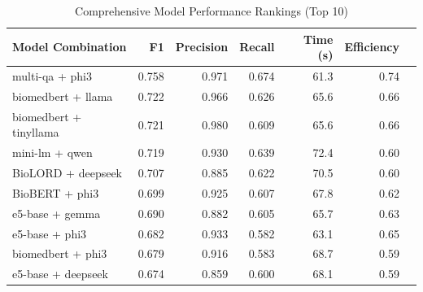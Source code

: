 \begin{table}
\caption{Comprehensive Model Performance Rankings (Top 10)}
\label{tab:comprehensive_rankings}
\begin{tabular}{lrrrrrr}
\toprule
Model Combination & F1 & Precision & Recall & Time (s) & Efficiency \\
\midrule
multi-qa + phi3 & 0.758 & 0.971 & 0.674 & 61.3 & 0.74 \\
biomedbert + llama & 0.722 & 0.966 & 0.626 & 65.6 & 0.66 \\
biomedbert + tinyllama & 0.721 & 0.980 & 0.609 & 65.6 & 0.66 \\
mini-lm + qwen & 0.719 & 0.930 & 0.639 & 72.4 & 0.60 \\
BioLORD + deepseek & 0.707 & 0.885 & 0.622 & 70.5 & 0.60 \\
BioBERT + phi3 & 0.699 & 0.925 & 0.607 & 67.8 & 0.62 \\
e5-base + gemma & 0.690 & 0.882 & 0.605 & 65.7 & 0.63 \\
e5-base + phi3 & 0.682 & 0.933 & 0.582 & 63.1 & 0.65 \\
biomedbert + phi3 & 0.679 & 0.916 & 0.583 & 68.7 & 0.59 \\
e5-base + deepseek & 0.674 & 0.859 & 0.600 & 68.1 & 0.59 \\
\bottomrule
\end{tabular}
\end{table}